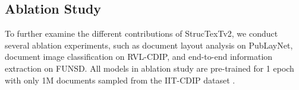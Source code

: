 \documentclass{article} \usepackage{iclr2023_conference,times}
\begin{document}
\begin{table}[ht]
\caption{Performance comparisons on FUNSD. We present the Normalized Edit Distance (1-NED) for the word-level document OCR and the entity-level information extraction. The \textbf{*} denotes a multi-stage process in which the methods are applied using our OCR results and entity boxes for word grouping in information extraction.}
\label{FUNSD}
\begin{minipage}[c]{0.53\linewidth}
\begin{center}
\end{center}
\end{minipage}
\begin{minipage}[c]{0.45\linewidth}
\begin{center}
\end{center}
\end{minipage}
\vspace{-0.5em}
\end{table}

\subsection{Ablation Study}
To further examine the different contributions of StrucTexTv2, we conduct several ablation experiments, such as document layout analysis on PubLayNet, document image classification on RVL-CDIP, and end-to-end information extraction on FUNSD. All models in ablation study are pre-trained for 1 epoch with only 1M documents sampled from the IIT-CDIP dataset .
\end{document}

